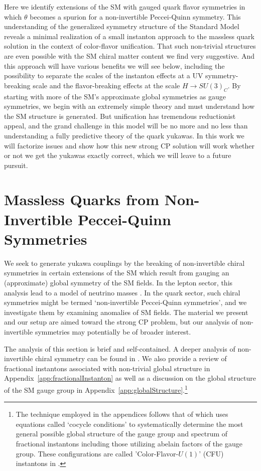 \documentclass[11pt,a4paper]{article}
\begin{document}
Here we identify extensions of the SM with gauged quark flavor symmetries in which $\theta$ becomes a spurion for a non-invertible Peccei-Quinn symmetry. This understanding of the generalized symmetry structure of the Standard Model reveals a minimal realization of a small instanton approach to the massless quark solution in the context of color-flavor unification. 
That such non-trivial structures are even possible with the SM chiral matter content we find very suggestive. 
And this approach will have various benefits we will see below, including the possibility to separate the scales of the instanton effects at a UV symmetry-breaking scale and the flavor-breaking effects at the scale $H \rightarrow SU(3)_C$.
By starting with more of the SM's approximate global symmetries as gauge symmetries, we begin with an extremely simple theory and must understand how the SM structure is generated.
But unification has tremendous reductionist appeal, and the grand challenge in this model will be no more and no less than understanding a fully predictive theory of the quark yukawas. In this work we will factorize issues and show how this new strong CP solution will work whether or not we get the yukawas exactly correct, which we will leave to a future pursuit.

\section{Massless Quarks from Non-Invertible Peccei-Quinn Symmetries} \label{sec:fromIR}

We seek to generate yukawa couplings by the breaking of non-invertible chiral symmetries in certain extensions of the SM which result from gauging an (approximate) global symmetry of the SM fields. In the lepton sector, this analysis lead to a model of neutrino masses \cite{Cordova:2022fhg}. In the quark sector, such chiral symmetries might be termed `non-invertible Peccei-Quinn symmetries', and we investigate them by examining anomalies of SM fields. The material we present and our setup are aimed toward the strong CP problem, but our analysis of non-invertible symmetries may potentially be of broader interest. 

The analysis of this section is brief and self-contained.  A deeper analysis of non-invertible chiral symmetry can be found in \cite{Choi:2022jqy, Cordova:2022ieu}. We also provide a review of fractional instantons associated with non-trivial global structure in Appendix~\ref{app:fractionalInstanton} as well as a discussion on the global structure of the SM gauge group in Appendix~\ref{app:globalStructure}.\footnote{The technique employed in the appendices follows that of \cite{Anber:2021iip} which uses equations called `cocycle conditions' to systematically determine the most general possible global structure of the gauge group and spectrum of fractional instantons including those utilizing abelain factors of the gauge group. These configurations are called 'Color-Flavor-$U(1)$' (CFU) instantons in \cite{Anber:2021iip}.}
\end{document}
